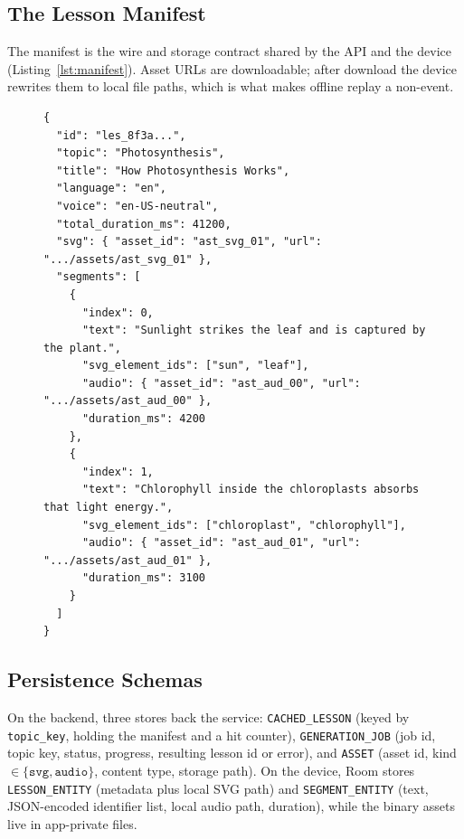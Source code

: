 \subsection{The Lesson Manifest}

The manifest is the wire and storage contract shared by the API and the
device (Listing~\ref{lst:manifest}). Asset URLs are downloadable; after
download the device rewrites them to local file paths, which is what makes
offline replay a non-event.

\begin{figure}[htbp]
\begin{lstlisting}[style=code,
  caption={Lesson manifest (abridged): the wire and storage contract.},
  label={lst:manifest}]
{
  "id": "les_8f3a...",
  "topic": "Photosynthesis",
  "title": "How Photosynthesis Works",
  "language": "en",
  "voice": "en-US-neutral",
  "total_duration_ms": 41200,
  "svg": { "asset_id": "ast_svg_01", "url": ".../assets/ast_svg_01" },
  "segments": [
    {
      "index": 0,
      "text": "Sunlight strikes the leaf and is captured by the plant.",
      "svg_element_ids": ["sun", "leaf"],
      "audio": { "asset_id": "ast_aud_00", "url": ".../assets/ast_aud_00" },
      "duration_ms": 4200
    },
    {
      "index": 1,
      "text": "Chlorophyll inside the chloroplasts absorbs that light energy.",
      "svg_element_ids": ["chloroplast", "chlorophyll"],
      "audio": { "asset_id": "ast_aud_01", "url": ".../assets/ast_aud_01" },
      "duration_ms": 3100
    }
  ]
}
\end{lstlisting}
\end{figure}

\subsection{Persistence Schemas}

On the backend, three stores back the service: \texttt{CACHED\_LESSON}
(keyed by \texttt{topic\_key}, holding the manifest and a hit counter),
\texttt{GENERATION\_JOB} (job id, topic key, status, progress, resulting
lesson id or error), and \texttt{ASSET} (asset id, kind
$\in\{\texttt{svg},\texttt{audio}\}$, content type, storage path). On the
device, Room stores \texttt{LESSON\_ENTITY} (metadata plus local SVG path)
and \texttt{SEGMENT\_ENTITY} (text, JSON-encoded identifier list, local
audio path, duration), while the binary assets live in app-private files.

